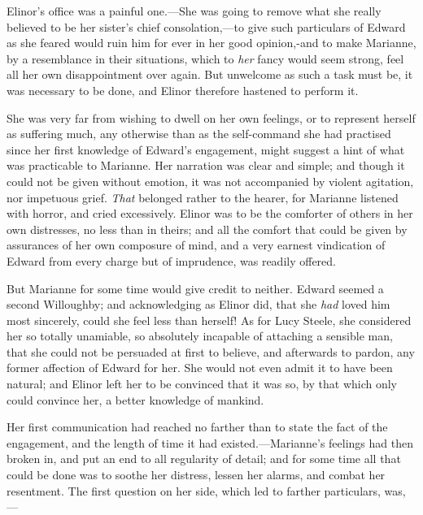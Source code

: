 Elinor's office was a painful one.---She was going to remove what she really believed to be her sister's chief consolation,---to give such particulars of Edward as she feared would ruin him for ever in her good opinion,-and to make Marianne, by a resemblance in their situations, which to {\em her} fancy would seem strong, feel all her own disappointment over again. But unwelcome as such a task must be, it was necessary to be done, and Elinor therefore hastened to perform it.

She was very far from wishing to dwell on her own feelings, or to represent herself as suffering much, any otherwise than as the self-command she had practised since her first knowledge of Edward's engagement, might suggest a hint of what was practicable to Marianne. Her narration was clear and simple; and though it could not be given without emotion, it was not accompanied by violent agitation, nor impetuous grief. {\em That} belonged rather to the hearer, for Marianne listened with horror, and cried excessively. Elinor was to be the comforter of others in her own distresses, no less than in theirs; and all the comfort that could be given by assurances of her own composure of mind, and a very earnest vindication of Edward from every charge but of imprudence, was readily offered.

But Marianne for some time would give credit to neither. Edward seemed a second Willoughby; and acknowledging as Elinor did, that she {\em had} loved him most sincerely, could she feel less than herself! As for Lucy Steele, she considered her so totally unamiable, so absolutely incapable of attaching a sensible man, that she could not be persuaded at first to believe, and afterwards to pardon, any former affection of Edward for her. She would not even admit it to have been natural; and Elinor left her to be convinced that it was so, by that which only could convince her, a better knowledge of mankind.

Her first communication had reached no farther than to state the fact of the engagement, and the length of time it had existed.---Marianne's feelings had then broken in, and put an end to all regularity of detail; and for some time all that could be done was to soothe her distress, lessen her alarms, and combat her resentment. The first question on her side, which led to farther particulars, was,---



